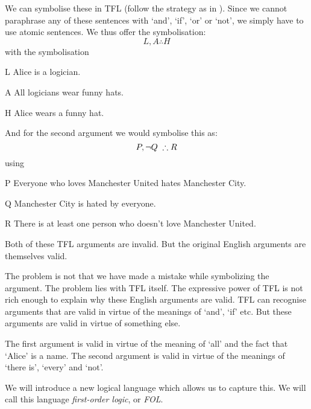 We can symbolise these in TFL (follow the strategy as in \pageref{s:SymbolisingComplexTFL}). Since we cannot paraphrase any of these sentences with `and', `if', `or' or `not', we simply have to use atomic sentences. We thus offer the symbolisation:
$$L, A \therefore H$$
with the symbolisation 
\begin{ekey}
\item[L] Alice is a logician.
\item[A] All logicians wear funny hats.
\item[H] Alice wears a funny hat.
\end{ekey}

And for the second argument we would symbolise this as: 
\begin{equation*}
P, \enot Q\; \therefore R
\end{equation*}
using 
\begin{ekey}
\item[P] Everyone who loves Manchester United hates Manchester City.
\item[Q] Manchester City is hated by everyone.
\item[R] There is at least one person who doesn't love Manchester United. 
\end{ekey}

Both of these TFL arguments are invalid. But the original English arguments are themselves valid. 



The problem is not that we have made a mistake while symbolizing the argument. The problem lies with TFL itself. 
The expressive power of TFL is not rich enough to explain why these English arguments are valid. 
TFL can recognise arguments that are valid in virtue of the meanings of `and', `if' etc. But these arguments are valid in virtue of something else.  

The first argument is valid in virtue of the meaning of `all' and the fact that `Alice' is a name. The second argument is valid in virtue of the meanings of `there is', `every' and `not'.

We will introduce a new logical language which allows us to capture this. We will call this language \emph{first-order logic}, or \emph{FOL}.

